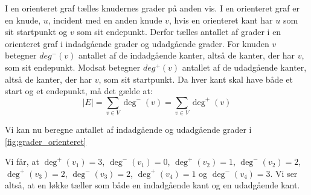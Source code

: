 I en orienteret graf tælles knudernes grader på anden vis. I en orienteret graf er en knude, $u$, incident med en anden knude $v$, hvis en orienteret kant har $u$ som sit startpunkt og $v$ som sit endepunkt. Derfor tælles antallet af grader i en orienteret graf i indadgående grader og udadgående grader. 
For knuden $v$ betegner $deg^{-}(v)$ antallet af de indadgående kanter, altså de kanter, der har $v$, som sit endepunkt. Modsat betegner $deg^{+}(v)$ antallet af de udadgående kanter, altså de kanter, der har $v$, som sit startpunkt. Da hver kant skal have både et start og et endepunkt, må det gælde at:
\begin{equation}
|E|=\sum_{v \in V} { } \deg^{-}(v) = \sum_{v \in V} { } \deg^{+}(v)
\end{equation}

\begin{exmp} \label{ex:grader_orienteret}
Vi kan nu beregne antallet af indadgående og udadgående grader i \autoref{fig:grader_orienteret}

Vi får, at $\deg^{+}(v_{1})=3$, $\deg^{-}(v_{1})=0$, $\deg^{+}(v_{2})=1$, $\deg^{-}(v_{2})=2$, $\deg^{+}(v_{3})=2$, $\deg^{-}(v_{3})=2$, $\deg^{+}(v_{4})=1$ og $\deg^{-}(v_{4})=3$. Vi ser altså, at en løkke tæller som både en indadgående kant og en udadgående kant.
\end{exmp}